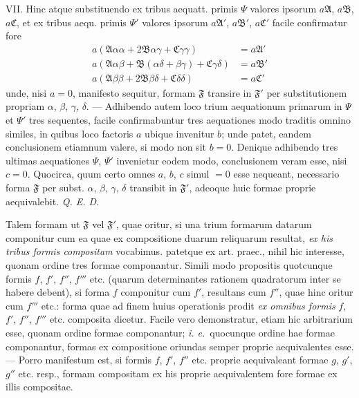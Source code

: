 VII. Hinc atque substituendo ex tribus aequatt. primis $\Psi$ valores ipsorum $a\mathfrak{A}$, $a\mathfrak{B}$, $a\mathfrak{C}$, et ex tribus aequ. primis $\Psi'$ valores ipsorum $a\mathfrak{A}'$, $a\mathfrak{B}'$, $a\mathfrak{C}'$ facile confirmatur fore
\[
\begin{aligned}
a(\mathfrak{A}\alpha\alpha+2\mathfrak{B}\alpha\gamma+\mathfrak{C}\gamma\gamma)&=a\mathfrak{A}'\\
a(\mathfrak{A}\alpha\beta+\mathfrak{B}(\alpha\delta+\beta\gamma)+\mathfrak{C}\gamma\delta)&=a\mathfrak{B}'\\
a(\mathfrak{A}\beta\beta+2\mathfrak{B}\beta\delta+\mathfrak{C}\delta\delta)&=a\mathfrak{C}'
\end{aligned}
\]
unde, nisi $a=0$, manifesto sequitur, formam $\mathfrak{F}$ transire in $\mathfrak{F}'$ per substitutionem propriam $\alpha$, $\beta$, $\gamma$, $\delta$. --- Adhibendo autem loco trium aequationum primarum in $\Psi$ et $\Psi'$ tres sequentes, facile confirmabuntur tres aequationes modo traditis omnino similes, in quibus loco factoris $a$ ubique invenitur $b$; unde patet, eandem conclusionem etiamnum valere, si modo non sit $b=0$. Denique adhibendo tres ultimas aequationes $\Psi$, $\Psi'$ invenietur eodem modo, conclusionem veram esse, nisi $c=0$. Quocirca, quum certo omnes $a$, $b$, $c$ simul $=0$ esse nequeant, necessario forma $\mathfrak{F}$ per subst. $\alpha$, $\beta$, $\gamma$, $\delta$ transibit in $\mathfrak{F}'$, adeoque huic formae proprie aequivalebit. \textit{Q. E. D.}

Talem formam ut $\mathfrak{F}$ vel $\mathfrak{F}'$, quae oritur, si una trium formarum datarum componitur cum ea quae ex compositione duarum reliquarum resultat, \textit{ex his tribus formis compositam} vocabimus. patetque ex art. praec., nihil hic interesse, quonam ordine tres formae componantur. Simili modo propositis quotcunque formis $f$, $f'$, $f''$, $f'''$ etc. (quarum determinantes rationem quadratorum inter se habere debent), si forma $f$ componitur cum $f'$, resultans cum $f''$, quae hinc oritur cum $f'''$ etc.: forma quae ad finem huius operationis prodit \textit{ex omnibus formis} $f$, $f'$, $f''$, $f'''$ etc. composita dicetur. Facile vero demonstratur, etiam hic arbitrarium esse, quonam ordine formae componantur; \textit{i. e.}\ quocunque ordine hae formae componantur, formas ex compositione oriundas semper proprie aequivalentes esse. --- Porro manifestum est, si formis $f$, $f'$, $f''$ etc. proprie aequivaleant formae $g$, $g'$, $g''$ etc. resp., formam compositam ex his proprie aequivalentem fore formae ex illis compositae.

